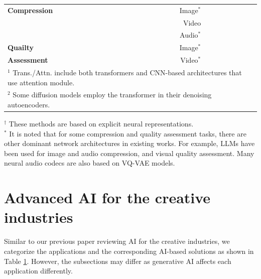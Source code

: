 \documentclass[11pt,a4paper]{article}
\begin{document}
\begin{table}
{\begin{tabular}{lr|lll}
{\bf Compression} & Image$^\ast$ & \cite{zhu2022transformer,zou2022devil,liu2023learned}& \cite{careil2023towards,yang2024lossy,hoogeboom2023high,ghouse2023residual} & \cite{sitzmann2020implicit,dupont2021coin,dupontcoin++,strumpler2022implicit}\\
& Video& \cite{xiang2022mimt,mentzer2022vct}& \cite{li2024extreme}&\cite{chen2021nerv,bai2023ps,kwan2024hinerv,kim2024c3,leguay2024cool,kwan2024nvrc,gao2024pnvc,ruan2024point,kwan2024immersive}\\
&Audio$^\ast$ & & &\\
\midrule
{\bf Quailty}  &  Image$^\ast$ & \cite{cheon2021perceptual,golestaneh2022no, shi2024transformer}& &\\
\textbf{Assessment}& Video$^\ast$ & \cite{wu2022fast,feng2024rankdvqa,wu2023exploringvideo,he2024cover,peng2024rmt}& & \\
\bottomrule
\multicolumn{5}{l}{$^1$ Trans./Attn. include both transformers and CNN-based architectures that use attention module.} \\
\multicolumn{5}{l}{$^2$ Some diffusion models employ the transformer in their denoising autoencoders.}
 \end{tabular}}
 \footnotesize
 $^\dag$ 
These methods are based on explicit neural representations. \\
$^*$ It is noted that for some compression and quality assessment tasks, there are other dominant network architectures in existing works. For example, LLMs have been used for image and audio compression, and visual quality assessment. Many neural audio codecs are also based on VQ-VAE models.
 
\label{tab:gather}
\end{table}
\section{Advanced AI for the creative industries}
\label{sec:existing}

Similar to our previous paper reviewing AI for the creative industries, we categorize the applications and the corresponding AI-based solutions as shown in Table \ref{tab:gather}. However, the subsections may differ as generative AI affects each application differently.

\end{document}
